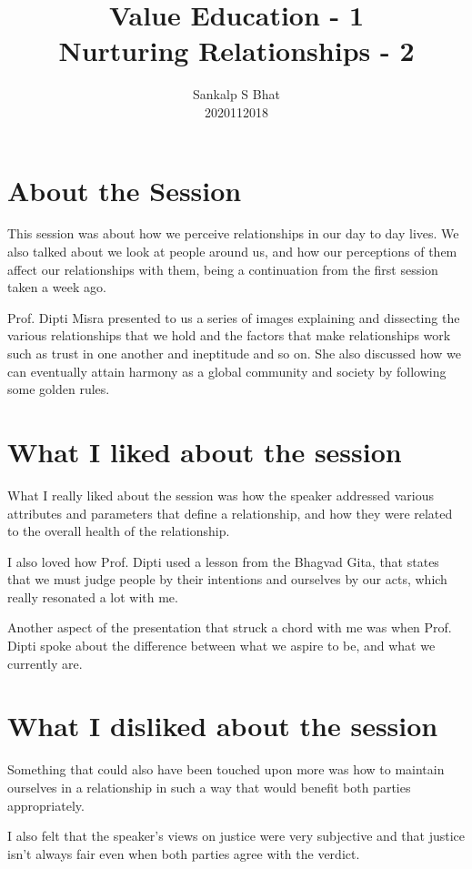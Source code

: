 \documentclass[a4paper, 12pt]{extarticle}
\title{Value Education - 1\\
Nurturing Relationships - 2}
\author{Sankalp S Bhat\\
2020112018
}
\begin{document}
\maketitle
\thispagestyle{empty}

\section*{About the Session}
This session was about how we perceive relationships in our day to day lives. We also talked about we look at people around us, and how our perceptions of them affect our relationships with them, being a continuation from the first session taken a week ago.

Prof. Dipti Misra presented to us a series of images explaining and dissecting the various relationships that we hold and the factors that make relationships work such as trust in one another and ineptitude and so on. She also discussed how we can eventually attain harmony as a global community and society by following some golden rules.
      
\section*{What I liked about the session}

What I really liked about the session was how the speaker addressed various attributes and parameters that define a relationship, and how they were related to the overall health of the relationship.
    
I also loved how Prof. Dipti used a lesson from the Bhagvad Gita, that states that we must judge people by their intentions and ourselves by our acts, which really resonated a lot with me.

Another aspect of the presentation that struck a chord with me was when Prof. Dipti spoke about the difference between what we aspire to be, and what we currently are.

 \section*{What I disliked about the session}
 
Something that could also have been touched upon more was how to maintain ourselves in a relationship in such a way that would benefit both parties appropriately.

I also felt that the speaker's views on justice were very subjective and that justice isn't always fair even when both parties agree with the verdict.
\end{document}
